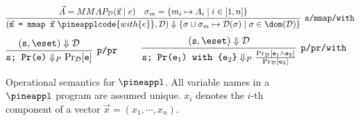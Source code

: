 \begin{figure}
\begin{mdframed}
{\begin{align*}
    \infer[\texttt{s/mmap/with}]
    {
      (\vec{\texttt{m}}\texttt{ = mmap }\vec{\texttt{x}} \ \pineapplcode{ with \{e\}}, \mathcal{D})
      \Downarrow
      \{\sigma \cup \sigma_m \mapsto \mathcal{D}(\sigma) \mid \sigma \in \dom(\mathcal{D}) \}
    }
    {
      \vec{A} = MMAP_{\mathcal D}(\vec{\texttt{x}} \mid e)
      & \sigma_m = \{m_i \mapsto A_i \mid i \in [1,n]\}
    }
  \end{align*}
  \begin{align*}
    \infer[\texttt{p/pr}]
    {
      \texttt{s; Pr(e)}  \Downarrow_P \Pr_{\mathcal D} [\texttt{e}]
    }
    {
      (\texttt s, \eset) \Downarrow \mathcal{D}
    } \;\;
    \qquad
    \infer[\texttt{p/pr/with}]
    {
      \texttt{s; Pr(e$_1$) with \{e$_2$\}} \Downarrow_P \frac{\Pr_{\mathcal{D}}[\texttt e_1 \land \texttt e_2]}{\Pr_{\mathcal{D}}[\texttt e_2]}
    }
    {
    (\texttt s, \eset) \Downarrow \mathcal{D}
    }
  \end{align*}
  }
\end{mdframed}
\caption{Operational semantics for $\pineappl$.
  All variable names in a $\pineappl$ program are assumed unique.
  $x_i$ denotes the $i$-th component of a vector $\vec{x} = (x_1, \cdots, x_n)$.}
\label{fig:pineappl-os}
\end{figure}
